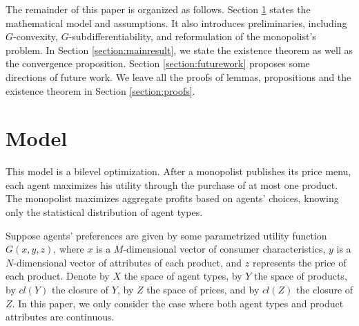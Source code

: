 \documentclass[a4paper, 11pt]{amsart}
\numberwithin{equation}{section}
\theoremstyle{plain}
\theoremstyle{definition}
\theoremstyle{remark}
\begin{document}
 



The remainder of this paper is organized as follows. Section \ref{section:model} states the mathematical model and assumptions. It also introduces preliminaries, including $G$-convexity, $G$-subdifferentiability, and reformulation of the monopolist's problem. In Section \ref{section:mainresult}, we state the existence theorem as well as the convergence proposition. Section \ref{section:futurework} proposes some directions of future work. We leave all the proofs of lemmas, propositions and the existence theorem in Section \ref{section:proofs}. 
 

\bigskip
 

\section{Model}\label{section:model}



{This model is a bilevel optimization. After a monopolist publishes its price menu, each agent maximizes his utility through the purchase of at most one product. The monopolist maximizes aggregate profits based on agents' choices, knowing only the statistical distribution of agent types.}\medskip


Suppose agents' preferences are given by some parametrized utility function  $G(x, y, z)$, where $x$ is a $M$-dimensional vector of consumer characteristics, $y$ is a $N$-dimensional vector of attributes of each product, and $z$ represents the price of each product. Denote {by} $X$ the space of agent types, by $Y$ the space of products, by $cl(Y)$ the closure of $Y$, by $Z$ the space of prices, and by $cl(Z)$ the closure of $Z$. {In this paper, we only consider the case where both agent types and product attributes are continuous.} \medskip
\end{document}
